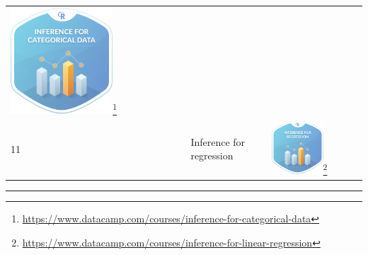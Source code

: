 \documentclass[12pt,]{krantz}
\renewcommand{\href}[2]{#2\footnote{\url{#1}}}
\begin{document}
\begin{longtable}[]{@{}lll@{}}
\begin{minipage}[t]{0.30\columnwidth}
\href{https://www.datacamp.com/courses/inference-for-categorical-data}{\includegraphics[width=0.6\textwidth]{images/datacamp_inference_for_categorical_data.png}}\strut
\end{minipage}\tabularnewline
\begin{minipage}[t]{0.30\columnwidth}\raggedright\strut
11\strut
\end{minipage} & \begin{minipage}[t]{0.30\columnwidth}\raggedright\strut
Inference for regression\strut
\end{minipage} & \begin{minipage}[t]{0.30\columnwidth}\raggedright\strut
\href{https://www.datacamp.com/courses/inference-for-linear-regression}{\includegraphics[width=0.6\textwidth]{images/datacamp_inference_for_regression.png}}\strut
\end{minipage}\tabularnewline
\bottomrule
\end{longtable}

\begin{center}\rule{0.5\linewidth}{\linethickness}\end{center}
\end{document}
